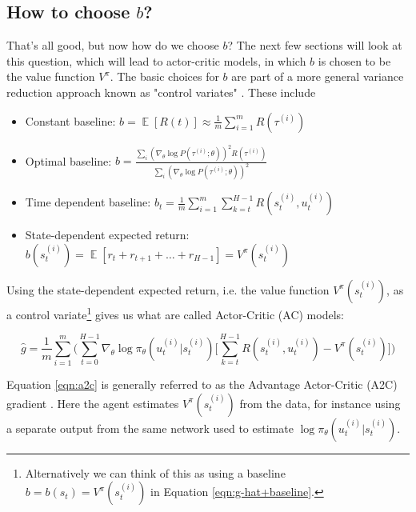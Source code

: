 \documentclass[11pt, oneside]{article}   	%
\DeclareMathOperator{\E}{\mathbb{E}}
\begin{document}
\subsection{How to choose $b$?}
\label{seq:choosing_b}

That's all good, but now how do we choose $b$? The next few sections will look at this question, which will lead to actor-critic models, in which $b$ is chosen to be the value function $V^\pi$. The basic 
choices for $b$ are part of a more general variance reduction approach known as "control variates" \cite{Greensmith:2004:VRT:1005332.1044710}. These include

\begin{itemize}
\item Constant baseline: $b = \E [R(t)] \approx \frac{1}{m} \sum\limits_{i = 1}^{m} R(\tau^{(i)})$ \\
\item Optimal baseline: $b = \frac{\sum\limits_i (\nabla_\theta \log P(\tau^{(i)}; \theta))^2 R(\tau^{(i)})}
{\sum\limits_i (\nabla_\theta \log P(\tau^{(i)}; \theta))^2}$
\item Time dependent baseline: $b_t = \frac{1}{m} \sum\limits_{i = 1}^{m} \sum\limits_{k = t}^{H -1} R(s^{(i)}_t, u^{(i)}_t)$
\item State-dependent expected return: $b(s^{(i)}_t) = \E[r_t + r_{t + 1} + \hdots + r_{H - 1}] = V^{\pi}(s^{(i)}_t)$
\end{itemize}

\bigskip
\noindent
Using the state-dependent expected return, i.e. the value function $V^\pi(s^{(i)}_t)$,  as a control variate\footnote{Alternatively we can think of this as using a baseline 
$b = b(s_t) = V^{\pi}(s^{(i)}_t)$ in Equation \ref{eqn:g-hat+baseline}.} gives us what are called Actor-Critic (AC) models:

\bigskip
\begin{equation}
\hat{g} = \frac{1}{m} \sum\limits_{i = 1}^{m} \Bigg ( \sum\limits_{t = 0}^{H - 1} \nabla_{\theta} \log \pi_{\theta} (u^{(i)}_t | s^{(i)}_t) \Bigg [
 \sum\limits_{k = t}^{H - 1} R(s^{(i)}_t, u^{(i)}_t) 
- V^{\pi}(s^{(i)}_t) \Bigg ] \Bigg )
\label{eqn:a2c}
\end{equation}

\bigskip
\noindent
Equation \ref{eqn:a2c} is generally referred to as the Advantage Actor-Critic (A2C) gradient \cite{2018arXiv180302811S}. Here the agent estimates
$V^\pi (s^{(i)}_t)$ from the data, for instance using a separate
output from the same network used to estimate  $\log \pi_{\theta} (u^{(i)}_t | s^{(i)}_t)$.  
\end{document}

